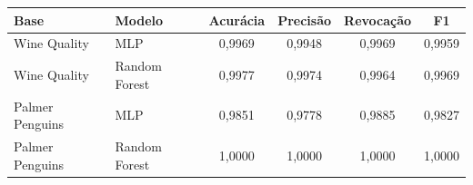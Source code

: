 \begin{tabular}{llcccc}
\toprule
Base & Modelo & Acurácia & Precisão & Revocação & F1 \\
\midrule
Wine Quality & MLP & 0,9969 & 0,9948 & 0,9969 & 0,9959 \\
Wine Quality & Random Forest & 0,9977 & 0,9974 & 0,9964 & 0,9969 \\
Palmer Penguins & MLP & 0,9851 & 0,9778 & 0,9885 & 0,9827 \\
Palmer Penguins & Random Forest & 1,0000 & 1,0000 & 1,0000 & 1,0000 \\
\bottomrule
\end{tabular}
